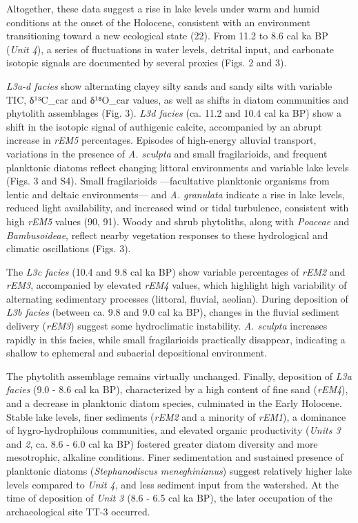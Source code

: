 \documentclass[
]{article}
\begin{document}
Altogether, these data suggest a rise in lake levels under warm and
humid conditions at the onset of the Holocene, consistent with an
environment transitioning toward a new ecological state (22). From 11.2
to 8.6 cal ka BP (\emph{Unit 4}), a series of fluctuations in water
levels, detrital input, and carbonate isotopic signals are documented by
several proxies (Figs. 2 and 3).

\emph{L3a-d facies} show alternating clayey silty sands and sandy silts
with variable TIC, δ¹³C\_car and δ¹⁸O\_car values, as well as shifts in
diatom communities and phytolith assemblages (Fig. 3). \emph{L3d facies}
(ca. 11.2 and 10.4 cal ka BP) show a shift in the isotopic signal of
authigenic calcite, accompanied by an abrupt increase in \emph{rEM5}
percentages. Episodes of high-energy alluvial transport, variations in
the presence of \emph{A. sculpta} and small fragilarioids, and frequent
planktonic diatoms reflect changing littoral environments and variable
lake levels (Figs. 3 and S4). Small fragilarioids ---facultative
planktonic organisms from lentic and deltaic environments--- and
\emph{A. granulata} indicate a rise in lake levels, reduced light
availability, and increased wind or tidal turbulence, consistent with
high \emph{rEM5} values (90, 91). Woody and shrub phytoliths, along with
\emph{Poaceae} and \emph{Bambusoideae}, reflect nearby vegetation
responses to these hydrological and climatic oscillations (Figs. 3).

The \emph{L3c facies} (10.4 and 9.8 cal ka BP) show variable percentages
of \emph{rEM2} and \emph{rEM3}, accompanied by elevated \emph{rEM4}
values, which highlight high variability of alternating sedimentary
processes (littoral, fluvial, aeolian). During deposition of \emph{L3b
facies} (between ca. 9.8 and 9.0 cal ka BP), changes in the fluvial
sediment delivery (\emph{rEM3}) suggest some hydroclimatic instability.
\emph{A. sculpta} increases rapidly in this facies, while small
fragilarioids practically disappear, indicating a shallow to ephemeral
and subaerial depositional environment.

The phytolith assemblage remains virtually unchanged. Finally,
deposition of \emph{L3a facies} (9.0 - 8.6 cal ka BP), characterized by
a high content of fine sand (\emph{rEM4}), and a decrease in planktonic
diatom species, culminated in the Early Holocene. Stable lake levels,
finer sediments (\emph{rEM2} and a minority of \emph{rEM1}), a dominance
of hygro-hydrophilous communities, and elevated organic productivity
(\emph{Units 3} and \emph{2}, ca. 8.6 - 6.0 cal ka BP) fostered greater
diatom diversity and more mesotrophic, alkaline conditions. Finer
sedimentation and sustained presence of planktonic diatoms
(\emph{Stephanodiscus meneghinianus}) suggest relatively higher lake
levels compared to \emph{Unit 4}, and less sediment input from the
watershed. At the time of deposition of \emph{Unit 3} (8.6 - 6.5 cal ka
BP), the later occupation of the archaeological site TT-3 occurred.
\end{document}
